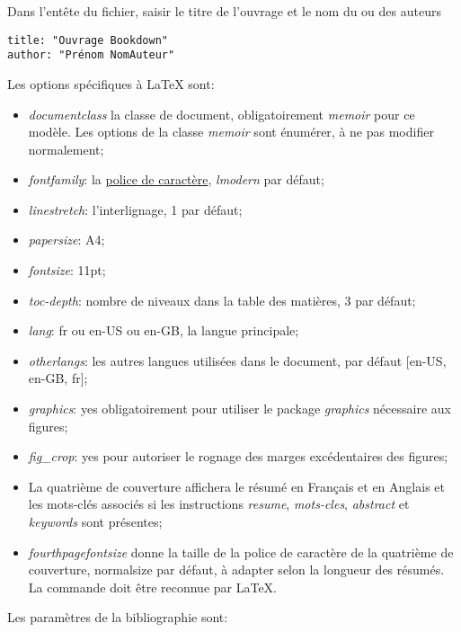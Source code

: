\documentclass[
  11pt,
  french,
  a4paper,
  extrafontsizes,onecolumn,openright
  ]{memoir}
\begin{document}
Dans l'entête du fichier, saisir le titre de l'ouvrage et le nom du ou des auteurs

\begin{verbatim}
title: "Ouvrage Bookdown" 
author: "Prénom NomAuteur"
\end{verbatim}

Les options spécifiques à LaTeX sont:

\begin{itemize}
\item
  \emph{documentclass} la classe de document, obligatoirement \emph{memoir} pour ce modèle. Les options de la classe \emph{memoir} sont énumérer, à ne pas modifier normalement;
\item
  \emph{fontfamily}: la \href{https://en.wikibooks.org/wiki/LaTeX/Fonts\#Font_families}{police de caractère}, \emph{lmodern} par défaut;
\item
  \emph{linestretch}: l'interlignage, 1 par défaut;
\item
  \emph{papersize}: A4;
\item
  \emph{fontsize}: 11pt;
\item
  \emph{toc-depth}: nombre de niveaux dans la table des matières, 3 par défaut;
\item
  \emph{lang}: fr ou en-US ou en-GB, la langue principale;
\item
  \emph{otherlangs}: les autres langues utilisées dans le document, par défaut {[}en-US, en-GB, fr{]};
\item
  \emph{graphics}: yes obligatoirement pour utiliser le package \emph{graphics} nécessaire aux figures;
\item
  \emph{fig\_crop}: yes pour autoriser le rognage des marges excédentaires des figures;
\item
  La quatrième de couverture affichera le résumé en Français et en Anglais et les mots-clés associés si les instructions \emph{resume}, \emph{mots-cles}, \emph{abstract} et \emph{keywords} sont présentes;
\item
  \emph{fourthpagefontsize} donne la taille de la police de caractère de la quatrième de couverture, normalsize par défaut, à adapter selon la longueur des résumés. La commande doit être reconnue par LaTeX.
\end{itemize}

Les paramètres de la bibliographie sont:
\end{document}

